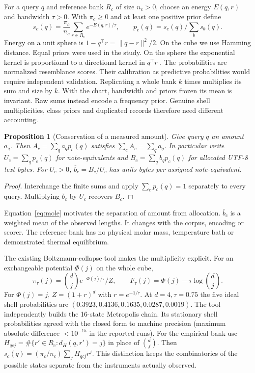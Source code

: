 \documentclass[11pt,a4paper]{article}
\newtheorem{proposition}{Proposition}
\begin{document}
For a query $q$ and reference bank $R_c$ of size $n_c>0$, choose an energy $E(q,r)$ and bandwidth $\tau>0$. With $\pi_c\ge0$ and at least one positive prior define
\begin{equation}
 s_c(q)=\frac{\pi_c}{n_c}\sum_{r\in R_c}e^{-E(q,r)/\tau},
 \qquad p_c(q)=s_c(q)\big/\sum_b s_b(q).                 \label{eq:alloc}
\end{equation}
Energy on a unit sphere is $1-q^\top r=\|q-r\|^2/2$. On the cube we use Hamming distance. Equal priors were used in the study. On the sphere the exponential kernel is proportional to a directional kernel in $q^\top r$ \citep{zhang}. The probabilities are normalized resemblance scores. Their calibration as predictive probabilities would require independent validation. Replicating a whole bank $k$ times multiplies its sum and size by $k$. With the chart, bandwidth and priors frozen its mean is invariant. Raw sums instead encode a frequency prior. Genuine shell multiplicities, class priors and duplicated records therefore need different accounting.

\begin{proposition}[Conservation of a measured amount]
Give query $q$ an amount $a_q$. Then $A_c=\sum_q a_qp_c(q)$ satisfies $\sum_c A_c=\sum_q a_q$. In particular write $U_c=\sum_qp_c(q)$ for note-equivalents and $B_c=\sum_q b_qp_c(q)$ for allocated UTF-8 text bytes. For $U_c>0$, $\overline b_c=B_c/U_c$ has units bytes per assigned note-equivalent.
\end{proposition}
\begin{proof}Interchange the finite sums and apply $\sum_c p_c(q)=1$ separately to every query. Multiplying $\overline b_c$ by $U_c$ recovers $B_c$.\end{proof}
Equation~\eqref{eq:mole} motivates the separation of amount from allocation. $\overline b_c$ is a weighted mean of the observed lengths. It changes with the corpus, encoding or scorer. The reference bank has no physical molar mass, temperature bath or demonstrated thermal equilibrium.

The existing Boltzmann-collapse tool makes the multiplicity explicit. For an exchangeable potential $\Phi(j)$ on the whole cube,
\[
 \pi_\tau(j)=\binom dj e^{-\Phi(j)/\tau}/Z,\qquad
 F_\tau(j)=\Phi(j)-\tau\log\binom dj.
\]
For $\Phi(j)=j$, $Z=(1+r)^d$ with $r=e^{-1/\tau}$. At $d=4,\tau=0.75$ the five ideal shell probabilities are $(0.3923,0.4136,0.1635,0.0287,0.0019)$. The tool independently builds the 16-state Metropolis chain. Its stationary shell probabilities agreed with the closed form to machine precision (maximum absolute difference $<10^{-15}$ in the reported runs). For the empirical bank use $H_{qcj}=\#\{r'\in R_c:d_H(q,r')=j\}$ in place of $\binom dj$. Then $s_c(q)=(\pi_c/n_c)\sum_j H_{qcj}r^j$. This distinction keeps the combinatorics of the possible states separate from the instruments actually observed.
\end{document}
